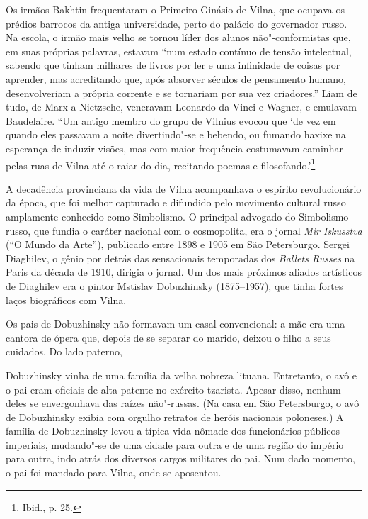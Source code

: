 Os irmãos Bakhtin frequentaram o Primeiro Ginásio de Vilna, que ocupava
os prédios barrocos da antiga universidade, perto do palácio do
governador russo. Na escola, o irmão mais velho se tornou líder dos
alunos não"-conformistas que, em suas próprias palavras, estavam ``num
estado contínuo de tensão intelectual, sabendo que tinham milhares de
livros por ler e uma infinidade de coisas por aprender, mas acreditando
que, após absorver séculos de pensamento humano, desenvolveriam a
própria corrente e se tornariam por sua vez criadores.'' Liam de tudo,
de Marx a Nietzsche, veneravam Leonardo da Vinci e Wagner, e emulavam
Baudelaire. ``Um antigo membro do grupo de Vilnius evocou que `de vez em
quando eles passavam a noite divertindo"-se e bebendo, ou fumando haxixe
na esperança de induzir visões, mas com maior frequência costumavam
caminhar pelas ruas de Vilna até o raiar do dia, recitando poemas e
filosofando.'\footnote{Ibid., p. 25.}

\asterisc

A decadência provinciana da vida de Vilna acompanhava o espírito
revolucionário da época, que foi melhor capturado e difundido pelo
movimento cultural russo amplamente conhecido como Simbolismo. O
principal advogado do Simbolismo russo, que fundia o caráter nacional
com o cosmopolita, era o jornal \textit{Mir Iskusstva} (``O Mundo da
Arte''), publicado entre 1898 e 1905 em São Petersburgo. Sergei
Diaghilev, o gênio por detrás das sensacionais temporadas dos
\textit{Ballets Russes} na Paris da década de 1910, dirigia o jornal. Um
dos mais próximos aliados artísticos de Diaghilev era o pintor Mstislav
Dobuzhinsky (1875--1957), que tinha fortes laços biográficos com Vilna.

Os pais de Dobuzhinsky não formavam um casal convencional: a mãe era uma
cantora de ópera que, depois de se separar do marido, deixou o filho a
seus cuidados. Do lado paterno,\linebreak

\noindent{}Dobuzhinsky vinha de uma família da
velha nobreza lituana. Entretanto, o avô e o pai eram oficiais de alta
patente no exército tzarista. Apesar disso, nenhum deles se envergonhava
das raízes não"-russas. (Na casa em São Petersburgo, o avô de Dobuzhinsky
exibia com orgulho retratos de heróis nacionais poloneses.) A família de
Dobuzhinsky levou a típica vida nômade dos funcionários públicos
imperiais, mudando"-se de uma cidade para outra e de uma região do
império para outra, indo atrás dos diversos cargos militares do pai. Num
dado momento, o pai foi mandado para Vilna, onde se aposentou.

